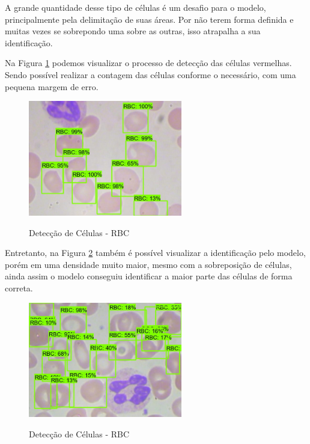 A grande quantidade desse tipo de células é um desafio para o modelo, principalmente pela delimitação de suas áreas. Por não terem forma definida e muitas vezes se sobrepondo uma sobre as outras, isso atrapalha a sua identificação.

Na Figura \ref{fig:predict_rbc} podemos visualizar o processo de detecção das células vermelhas. Sendo possível realizar a contagem das células conforme o necessário, com uma pequena margem de erro. 

\begin{figure}[!htb]
	\centering
	\caption{Detecção de Células - RBC}
	\includegraphics[width=0.60\textwidth]{img/predict_rbc.jpeg}
	\label{fig:predict_rbc}
\end{figure}

Entretanto, na Figura \ref{fig:predict_rbc_2} também é possível visualizar a identificação pelo modelo, porém em uma densidade muito maior, mesmo com a sobreposição de células, ainda assim o modelo conseguiu identificar a maior parte das células de forma correta.

\begin{figure}[!htb]
	\centering
	\caption{Detecção de Células - RBC}
	\includegraphics[width=0.60\textwidth]{img/predict_rbc_2.jpeg}
	\label{fig:predict_rbc_2}
\end{figure}

